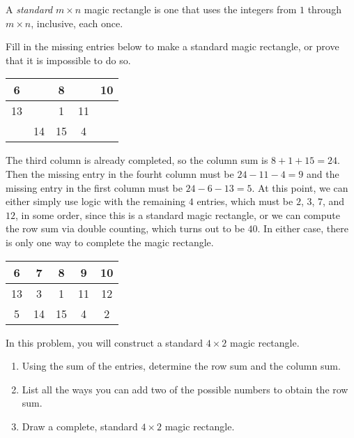 \documentclass[11pt]{article}
\renewenvironment{problem}{\begin{problems}}{\end{problems}\vspace{5pt}}
\begin{document}
\begin{definition}
A \textit{standard} $m \times n$ magic rectangle is one that uses the integers from $1$ through $m\times n$, inclusive, each once.
\end{definition}

\begin{problem}[3 points]
Fill in the missing entries below to make a standard magic rectangle, or prove that it is impossible to do so.
\begin{center}
\begin{tabular}{|c|c|c|c|c|}
\hline
6 & \phantom{7} & 8 & \phantom{9} & 10 \\ \hline
13 & \phantom{3} & 1 & 11 & \phantom{12} \\ \hline
\phantom{5} & 14 & 15 & 4 & \phantom{2} \\ \hline
\end{tabular}
\end{center}
\end{problem}

\begin{solution}
The third column is already completed, so the column sum is $8+1+15 = 24$. Then the missing entry in the
fourht column must be $24-11-4=9$ and the missing entry in the first column must be $24-6-13=5$.
At this point, we can either simply use logic with the remaining $4$ entries, which must be
$2$, $3$, $7$, and $12$, in some order, since this is a standard magic rectangle, or we can compute
the row sum via double counting, which turns out to be $40$. In either case, there is only one way to complete the magic rectangle.
\begin{center}
\begin{tabular}{|c|c|c|c|c|}
\hline
6 & 7 & 8 & 9 & 10 \\ \hline
13 & 3 & 1 & 11 & 12 \\ \hline
5 & 14 & 15 & 4 & 2 \\ \hline
\end{tabular}
\end{center}
\end{solution}


\begin{problem}[8=2+2+4 points]
In this problem, you will construct a standard $4 \times 2$ magic rectangle.
\begin{enumerate}[label=(\alph*)]
\item Using the sum of the entries, determine the row sum and the column sum.

\item List all the ways you can add two of the possible numbers to obtain the row sum.

\item Draw a complete, standard $4 \times 2$ magic rectangle.
\end{enumerate}
\end{problem}
\end{document}
